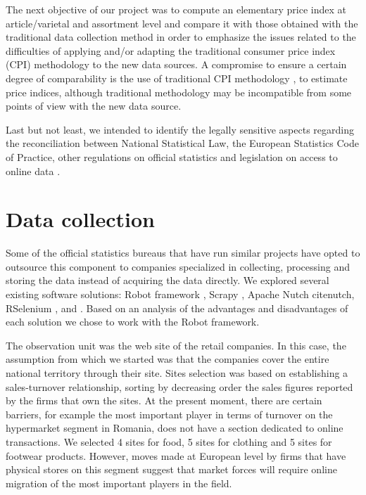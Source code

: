 \documentclass[]{article}
\begin{document}
The next objective of our project was to compute an elementary price index at article/varietal and assortment level and compare 
it with those obtained with the traditional data collection method in order to emphasize the issues related to the difficulties 
of applying and/or adapting the traditional consumer price index (CPI) methodology \cite{cpi} to the new data sources.  A compromise to 
ensure a certain degree of comparability is the use of traditional CPI methodology \cite{cpi2}, \cite{cpi3} to estimate price indices, although 
traditional methodology may be incompatible from some points of view with the new data source. 


Last but not least, we intended to identify the legally sensitive aspects regarding the reconciliation between 
National Statistical Law, the European Statistics Code of Practice, other regulations on official statistics 
and legislation on access to online data \cite{swier}.


\section{Data collection}

Some of the official statistics bureaus that have run similar projects have opted to outsource this component to companies specialized 
in collecting, processing and storing the data instead of acquiring the data directly. We explored several existing software solutions: 
Robot framework \cite{robot2018}, Scrapy \cite{scrapy1}, \cite{scrapy2} Apache Nutch cite{nutch}, RSelenium \cite{rs1}, \cite{rs2} 
and \cite{rvest}. 
Based on an analysis of the advantages and disadvantages of each solution we chose to work with the Robot framework. 


The observation unit was the web site of the retail companies. In this case, the assumption from which we started was 
that the companies cover the entire national territory through their site. Sites selection was based on establishing a 
sales-turnover relationship, sorting by decreasing order the sales figures reported by the firms that own the sites. 
At the present moment, there are certain barriers, for example the most important player in terms of turnover on the 
hypermarket segment in Romania, does not have a section dedicated to online transactions. We selected 4 sites for food, 
5 sites for clothing and 5 sites for footwear products. However, moves made at European level by firms that have physical 
stores on this segment suggest that market forces will require online migration of the most important players in the field.
\end{document}

